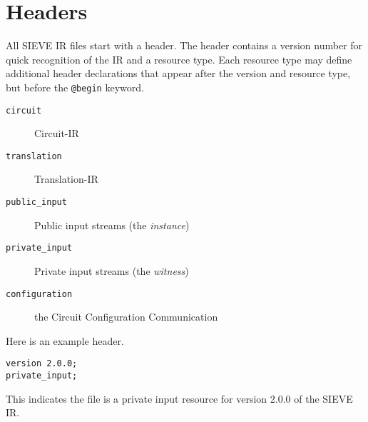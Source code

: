 \section{Headers}
\label{sec:headers}

All SIEVE IR files start with a header.
The header contains %
a version number for quick recognition of the IR
and
a resource type.
Each resource type may define additional header declarations that appear after the version and resource type, but before the \texttt{@begin} keyword.

\begin{description}
  \item[\texttt{circuit}] Circuit-IR
  \item[\texttt{translation}] Translation-IR
  \item[\texttt{public\_input}] Public input streams (the \textit{instance})
  \item[\texttt{private\_input}] Private input streams (the \textit{witness})
  \item[\texttt{configuration}] the Circuit Configuration Communication
\end{description}

%
Here is an example header.
\begin{lstlisting}[language=ir]
version 2.0.0;
private_input;
\end{lstlisting}
This indicates the file is a private input resource for version 2.0.0 of the SIEVE IR.


